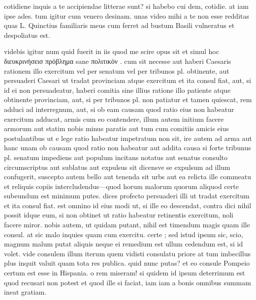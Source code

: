 


 cotidiene inquis a te accipiendae litterae sunt? si habebo cui dem, cotidie. at iam ipse ades. tum igitur cum venero desinam. unas video mihi a te non esse redditas quas L. Quinctius familiaris meus cum ferret ad bustum Basili vulneratus et despoliatus est.

 videbis igitur num quid fuerit in iis quod me scire opus sit et simul hoc διευκρινήσεισ πρόβλημα sane πολιτικόν . cum sit necesse aut haberi Caesaris rationem illo exercitum vel per senatum vel per tribunos pl. obtinente, aut persuaderi Caesari ut tradat provinciam atque exercitum et ita consul fiat, aut, si id ei non persuadeatur, haberi comitia sine illius ratione illo patiente atque obtinente provinciam, aut, si per tribunos pl. non patiatur et tamen quiescat, rem adduci ad interregnum, aut, si ob eam causam quod ratio eius non habeatur exercitum adducat, armis cum eo contendere, illum autem initium facere armorum aut statim nobis minus paratis aut tum cum comitiis amicis eius postulantibus ut e lege ratio habeatur impetratum non sit, ire autem ad arma aut hanc unam ob causam quod ratio non habeatur aut addita causa si forte tribunus pl. senatum impediens aut populum incitans notatus aut senatus consulto circumscriptus aut sublatus aut expulsus sit dicensve se expulsum ad illum confugerit, suscepto autem bello aut tenenda sit urbs aut ea relicta ille commeatu et reliquis copiis intercludendus—quod horum malorum quorum aliquod certe subeundum est minimum putes. dices profecto persuaderi illi ut tradat exercitum et ita consul fiat. est omnino id eius modi ut, si ille eo descendat, contra dici nihil possit idque eum, si non obtinet ut ratio habeatur retinentis exercitum, noli facere miror. nobis autem, ut quidam putant, nihil est timendum magis quam ille consul. at sic malo inquies quam cum exercitu. certe ; sed istud ipsum sic, scio, magnum malum putat aliquis neque ei remedium est ullum cedendum est, si id volet. vide consulem illum iterum quem vidisti consulatu priore at tum imbecillus plus inquit valuit quam tota res publica. quid nunc putas? et eo consule Pompeio certum est esse in Hispania. o rem miseram! si quidem id ipsum deterrimum est quod recusari non potest et quod ille si faciat, iam iam a bonis omnibus summam ineat gratiam.

